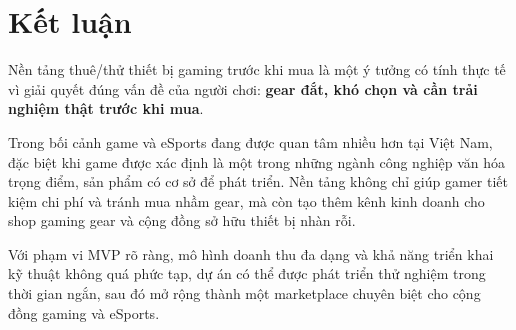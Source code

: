 \section{Kết luận}

Nền tảng thuê/thử thiết bị gaming trước khi mua là một ý tưởng có tính thực tế vì giải quyết đúng vấn đề của người chơi: \textbf{gear đắt, khó chọn và cần trải nghiệm thật trước khi mua}.

Trong bối cảnh game và eSports đang được quan tâm nhiều hơn tại Việt Nam, đặc biệt khi game được xác định là một trong những ngành công nghiệp văn hóa trọng điểm, sản phẩm có cơ sở để phát triển. Nền tảng không chỉ giúp gamer tiết kiệm chi phí và tránh mua nhầm gear, mà còn tạo thêm kênh kinh doanh cho shop gaming gear và cộng đồng sở hữu thiết bị nhàn rỗi.

Với phạm vi MVP rõ ràng, mô hình doanh thu đa dạng và khả năng triển khai kỹ thuật không quá phức tạp, dự án có thể được phát triển thử nghiệm trong thời gian ngắn, sau đó mở rộng thành một marketplace chuyên biệt cho cộng đồng gaming và eSports.
